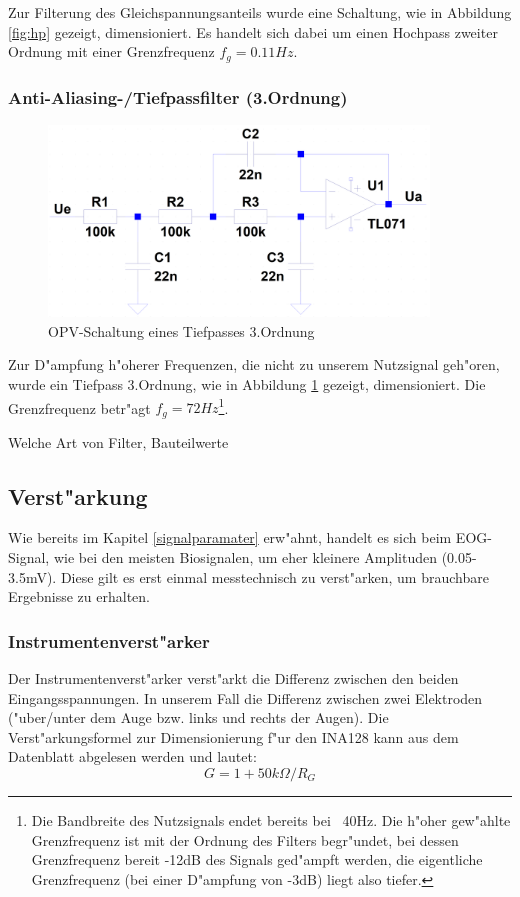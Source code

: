 Zur Filterung des Gleichspannungsanteils wurde eine Schaltung, wie in Abbildung \ref{fig:hp} gezeigt, dimensioniert. Es handelt sich dabei um einen Hochpass zweiter Ordnung mit einer Grenzfrequenz $f_g = 0.11Hz$.

\subsubsection {Anti-Aliasing-/Tiefpassfilter (3.Ordnung)} \label{tp}
\begin{figure}[H]
	\centering
		\includegraphics[width=0.9\textwidth]{Fuchs/Tiefpass.png}
	\caption{OPV-Schaltung eines Tiefpasses 3.Ordnung}
	\label{fig:tp}
\end{figure}

Zur D"ampfung h"oherer Frequenzen, die nicht zu unserem Nutzsignal geh"oren, wurde ein Tiefpass 3.Ordnung, wie in Abbildung \ref{fig:tp} gezeigt, dimensioniert. Die Grenzfrequenz betr"agt $f_g = 72Hz$\footnote{Die Bandbreite des Nutzsignals endet bereits bei ~40Hz. Die h"oher gew"ahlte Grenzfrequenz ist mit der Ordnung des Filters begr"undet, bei dessen Grenzfrequenz bereit -12dB des Signals ged"ampft werden, die eigentliche Grenzfrequenz (bei einer D"ampfung von -3dB) liegt also tiefer.}.

Welche Art von Filter, Bauteilwerte

\subsection {Verst"arkung} \label {verstaerkung}

Wie bereits im Kapitel \ref{signalparamater} erw"ahnt, handelt es sich beim EOG-Signal, wie bei den meisten Biosignalen, um eher kleinere Amplituden (0.05-3.5mV). Diese gilt es erst einmal messtechnisch zu verst"arken, um brauchbare Ergebnisse zu erhalten.

\subsubsection {Instrumentenverst"arker} \label{ina}
Der Instrumentenverst"arker verst"arkt die Differenz zwischen den beiden Eingangsspannungen. In unserem Fall die Differenz zwischen zwei Elektroden ("uber/unter dem Auge bzw. links und rechts der Augen). Die Verst"arkungsformel zur Dimensionierung f"ur den INA128 kann aus dem Datenblatt abgelesen werden und lautet:\\
\begin{equation}\label{eq:ina}
	G = 1 + {50k\Omega}/{R_G}
\end{equation}

